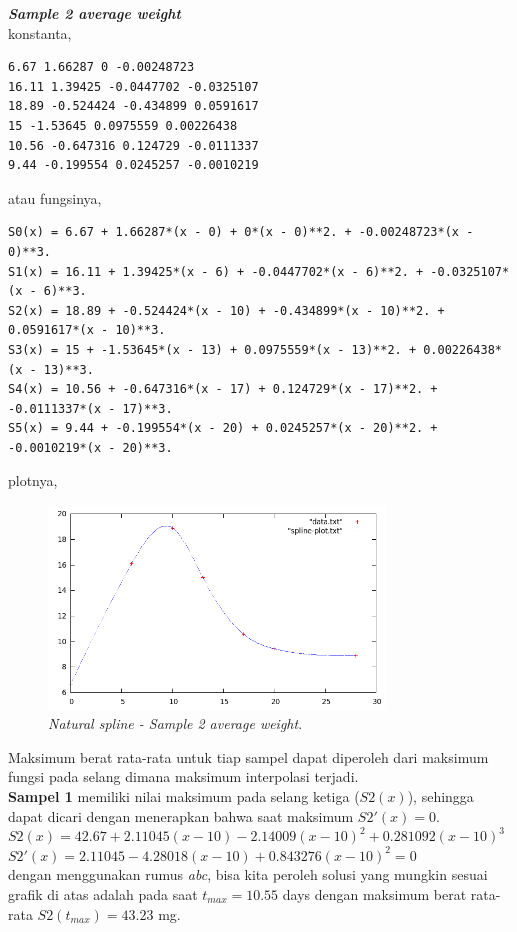 \documentclass[paper=a4, fontsize=11pt]{scrartcl}
\numberwithin{equation}{section} %
\numberwithin{figure}{section} %
\numberwithin{table}{section} %
\begin{document}
\textit{\textbf{Sample 2 average weight}}\\
konstanta,
\begin{small}
\begin{verbatim}
6.67 1.66287 0 -0.00248723
16.11 1.39425 -0.0447702 -0.0325107
18.89 -0.524424 -0.434899 0.0591617
15 -1.53645 0.0975559 0.00226438
10.56 -0.647316 0.124729 -0.0111337
9.44 -0.199554 0.0245257 -0.0010219
\end{verbatim}
\end{small}
atau fungsinya,
\begin{small}
\begin{verbatim}
S0(x) = 6.67 + 1.66287*(x - 0) + 0*(x - 0)**2. + -0.00248723*(x - 0)**3.
S1(x) = 16.11 + 1.39425*(x - 6) + -0.0447702*(x - 6)**2. + -0.0325107*(x - 6)**3.
S2(x) = 18.89 + -0.524424*(x - 10) + -0.434899*(x - 10)**2. + 0.0591617*(x - 10)**3.
S3(x) = 15 + -1.53645*(x - 13) + 0.0975559*(x - 13)**2. + 0.00226438*(x - 13)**3.
S4(x) = 10.56 + -0.647316*(x - 17) + 0.124729*(x - 17)**2. + -0.0111337*(x - 17)**3.
S5(x) = 9.44 + -0.199554*(x - 20) + 0.0245257*(x - 20)**2. + -0.0010219*(x - 20)**3.
\end{verbatim}
\end{small}
plotnya, 
\begin{figure}
	\centering
	\includegraphics[width=0.8\textwidth]
		{sample2.png}
	\caption{\textit{Natural spline - Sample 2 average weight}.}
\end{figure}

Maksimum berat rata-rata untuk tiap sampel dapat diperoleh dari maksimum fungsi pada selang dimana maksimum interpolasi terjadi.\\

\textbf{Sampel 1} memiliki nilai maksimum pada selang ketiga ($S2(x)$), sehingga dapat dicari dengan menerapkan bahwa saat maksimum $S2'(x) = 0$.\\
\hspace{2cm} $S2(x) = 42.67 + 2.11045(x - 10) - 2.14009(x - 10)^{2} + 0.281092(x - 10)^{3}$\\
\hspace{2cm}$S2'(x) = 2.11045 - 4.28018(x - 10) + 0.843276(x - 10)^{2} = 0 $\\
dengan menggunakan rumus \textit{abc}, bisa kita peroleh solusi yang mungkin sesuai grafik di atas adalah pada saat $t_{max} = 10.55$ days dengan maksimum berat rata-rata $S2(t_{max}) = 43.23$ mg.\\
\end{document}

